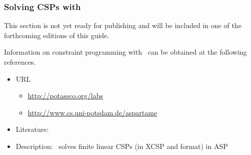 \subsubsection{Solving CSPs with \aspartame}
\label{sec:aspartame}

This section is not yet ready for publishing
and will be included in one of the forthcoming editions of this guide.

Information on constraint programming with \aspartame\ can be obtained at the following references.

\begin{itemize}
\item URL
\begin{itemize}
\item \url{http://potassco.org/labs}
\item \url{http://www.cs.uni-potsdam.de/aspartame}
\end{itemize}
\item Literature: \cite{bageinscsotawe13a}
\item Description: \aspartame\ solves finite linear CSPs (in XCSP and \sugar{} format) in ASP
\end{itemize}

